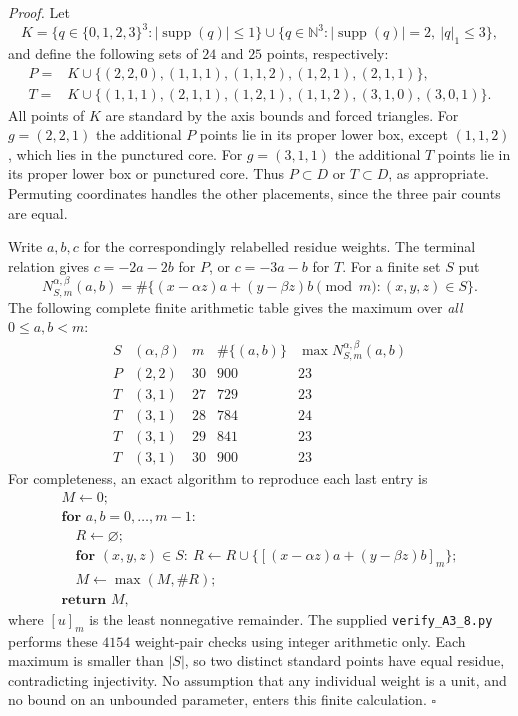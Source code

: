 \documentclass[11pt]{article}
\begin{document}
\emph{Proof.}
Let
\[
 K=\{q\in\{0,1,2,3\}^3:|\operatorname{supp}(q)|\le1\}
 \cup\{q\in\mathbb N^3:|\operatorname{supp}(q)|=2,\ |q|_1\le3\},
\]
and define the following sets of $24$ and $25$ points, respectively:
\[
\begin{aligned}
 P={}&K\cup\{(2,2,0),(1,1,1),(1,1,2),(1,2,1),(2,1,1)\},\\
 T={}&K\cup\{(1,1,1),(2,1,1),(1,2,1),(1,1,2),(3,1,0),(3,0,1)\}.
\end{aligned}
\]
All points of $K$ are standard by the axis bounds and forced triangles.
For $g=(2,2,1)$ the additional $P$ points lie in its proper lower box,
except $(1,1,2)$, which lies in the punctured core.  For $g=(3,1,1)$
the additional $T$ points lie in its proper lower box or punctured core.
Thus $P\subset D$ or $T\subset D$, as appropriate.  Permuting coordinates
handles the other placements, since the three pair counts are equal.

Write $a,b,c$ for the correspondingly relabelled residue weights.
The terminal relation gives $c=-2a-2b$ for $P$, or $c=-3a-b$ for $T$.
For a finite set $S$ put
\[
 N_{S,m}^{\alpha,\beta}(a,b)
 =\#\{(x-\alpha z)a+(y-\beta z)b\pmod m:(x,y,z)\in S\}.
\]
The following complete finite arithmetic table gives the maximum over
\emph{all} $0\le a,b<m$:
\[
\begin{array}{c|c|c|c|c}
 S&(\alpha,\beta)&m&\#\{(a,b)\}&\max N_{S,m}^{\alpha,\beta}(a,b)\\\hline
 P&(2,2)&30&900&23\\
 T&(3,1)&27&729&23\\
 T&(3,1)&28&784&24\\
 T&(3,1)&29&841&23\\
 T&(3,1)&30&900&23
\end{array}
\]
For completeness, an exact algorithm to reproduce each last entry is
\[
\begin{array}{l}
 M\gets0;\\
 \textbf{for }a,b=0,\ldots,m-1:\\
 \quad R\gets\varnothing;\\
 \quad\textbf{for }(x,y,z)\in S:\
       R\gets R\cup\{[(x-\alpha z)a+(y-\beta z)b]_m\};\\
 \quad M\gets\max(M,\#R);\\
 \textbf{return }M,
\end{array}
\]
where $[u]_m$ is the least nonnegative remainder.  The supplied
\texttt{verify\_A3\_8.py} performs these $4154$ weight-pair checks using
integer arithmetic only.  Each maximum is smaller than $|S|$, so two
distinct standard points have equal residue, contradicting injectivity.
No assumption that any individual weight is a unit, and no bound on an
unbounded parameter, enters this finite calculation. \ensuremath{\square}
\end{document}
